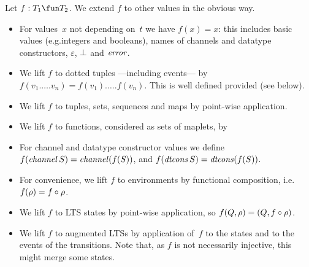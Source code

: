 Let $f : T_1 \fun T_2$.  We extend $f$ to other
values in the obvious way.
\begin{itemize}
\item For values~$x$ not depending on~$t$ we have $f(x) = x$: this includes
  basic values (e.g.integers and booleans), names of channels and datatype
  constructors, $\varepsilon$, $\perp$ and $\mathord{\it error}$.

\item We lift $f$ to dotted tuples ---including events--- by
  $f(v_1.\ldots.v_n) = f(v_1).\ldots.f(v_n)$.  This is well defined provided
   (see below).

\item We lift $f$ to tuples, sets, sequences and maps by point-wise
  application.

\item We lift $f$ to functions, considered as sets of maplets, by

\item For channel and datatype constructor values we define
  $f(\mathop{\it channel} S) = \mathop{\it channel} (f(S))$, and
  $f(\mathop{\it dtcons} S) = \mathop{\it dtcons} (f(S))$.

\item For convenience, we lift $f$ to environments by functional
  composition, i.e.~$f(\rho) = f\circ\rho$.

\item We lift $f$ to LTS states by point-wise application, so $f(Q,\rho) =
  (Q, f\circ\rho)$. 

\item We lift $f$ to augmented LTSs by application of~$f$ to the states
  and to the events of the transitions.  Note that, as $f$ is not necessarily
  injective, this might merge some states. 
\end{itemize}


